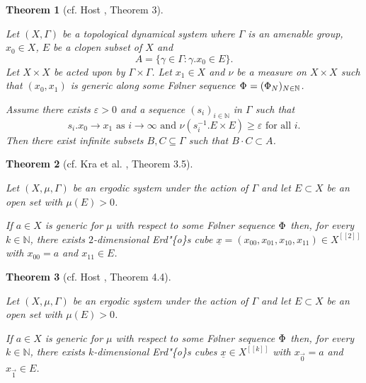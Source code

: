 \documentclass[
  british,
]{article}
\theoremstyle{plain}
\theoremstyle{definition}
\theoremstyle{plain}
\newtheorem{theorem}{Theorem}[section]
\theoremstyle{remark}
\newcommand{\AmenableGroup}{{\Gamma}}
\newcommand{\GroupOperation}[2]{{#1}\cdot{#2}}
\newcommand{\AmenableGroupElement}{{\gamma}}
\newcommand{\Folner}[1][\vphantom{}]{{\Phi}_{#1}}
\newcommand{\Measure}{{\mu}}
\newcommand{\GroupAction}[2]{{#1}.{#2}}
\begin{document}
\begin{theorem}[cf. Host , Theorem
3]\protect\hypertarget{thm-GenErdosConjDyn}{}\label{thm-GenErdosConjDyn}

Let \((X,\AmenableGroup)\) be a topological dynamical system where
\(\AmenableGroup\) is an amenable group, \(x_0\in X\), \(E\) be a clopen
subset of \(X\) and
\[A=\{\AmenableGroupElement\in\AmenableGroup:\GroupAction{\AmenableGroupElement}{x_0}\in E\}.\]
Let \(X\times X\) be acted upon by
\(\AmenableGroup\times\AmenableGroup\). Let \(x_1\in X\) and \(\nu\) be
a measure on \(X\times X\) such that \((x_0,x_1)\) is generic along some
Følner sequence \(\Folner=(\Folner[N])_{N\in\mathbb{N}}\).

Assume there exists \(\varepsilon>0\) and a sequence
\((s_i)_{i\in\mathbb{N}}\) in \(\AmenableGroup\) such that
\[\GroupAction{s_i}{x_0}\rightarrow x_1\text{ as }i\rightarrow\infty\text{ and }\nu(\GroupAction{s_i^{-1}}{E}\times E)\geq\varepsilon\text{ for all }i. \]
Then there exist infinite subsets \(B,C\subseteq \AmenableGroup\) such
that \(\GroupOperation{B}{C}\subset A\).

\end{theorem}

\begin{theorem}[cf. Kra et al. ,
Theorem
3.5]\protect\hypertarget{thm-GenErdosConjCube}{}\label{thm-GenErdosConjCube}

Let \((X,\Measure,\AmenableGroup)\) be an ergodic system under the
action of \(\AmenableGroup\) and let \(E\subset X\) be an open set with
\(\Measure(E)>0\).

If \(a\in X\) is generic for \(\Measure\) with respect to some Følner
sequence \(\Folner\) then, for every \(k\in\mathbb{N}\), there exists
\(2\)-dimensional Erd"\{o\}s cube
\(\underline{x}=(x_{00},x_{01},x_{10},x_{11})\in X^{[[2]]}\) with
\(x_{00}=a\) and \(x_{11}\in E\).

\end{theorem}

\begin{theorem}[cf. Host , Theorem
4.4]\protect\hypertarget{thm-GenNErdosConjCube}{}\label{thm-GenNErdosConjCube}

Let \((X,\Measure,\AmenableGroup)\) be an ergodic system under the
action of \(\AmenableGroup\) and let \(E\subset X\) be an open set with
\(\Measure(E)>0\).

If \(a\in X\) is generic for \(\Measure\) with respect to some Følner
sequence \(\Folner\) then, for every \(k\in\mathbb{N}\), there exists
\(k\)-dimensional Erd"\{o\}s cubes \(\underline{x}\in X^{[[k]]}\) with
\(x_{\vec{0}}=a\) and \(x_{\vec{1}}\in E\).

\end{theorem}
\end{document}
